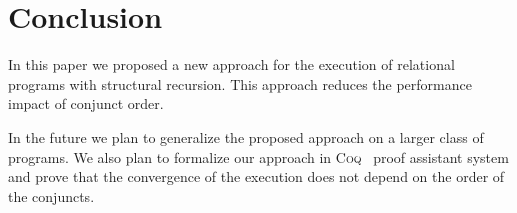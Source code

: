 \section{Conclusion}
\label{sec:conclusion}

In this paper we proposed a new approach for the execution of relational programs with structural recursion. This approach reduces the performance impact of conjunct order.

In the future we plan to generalize the proposed approach on a larger class of programs. We also plan to formalize our approach in \textsc{Coq}~\cite{fair:Coq} proof assistant
system and prove that the convergence of the execution does not depend on the order of the conjuncts.
